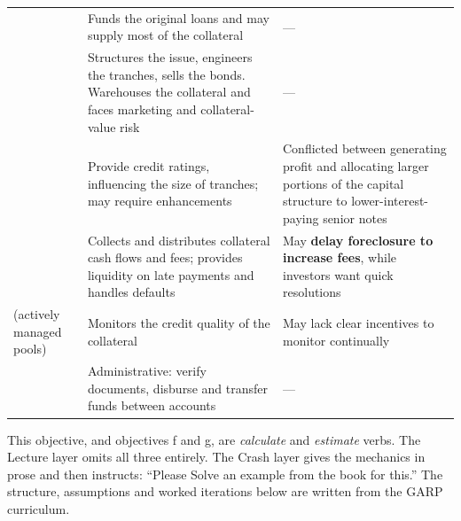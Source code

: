 \begin{center}
\footnotesize
\begin{tabular}{L{2.9cm} L{5.6cm} L{6.0cm}}
\toprule
{} &  &  \\
\midrule
{} & Funds the original loans and may supply most of the
  collateral & --- \\
 & Structures the issue, engineers the tranches, sells the
  bonds. Warehouses the collateral and faces marketing and collateral-value risk &
  --- \\
 & Provide credit ratings, influencing the size of
  tranches; may require enhancements &
  Conflicted between generating profit and allocating larger portions of the
  capital structure to lower-interest-paying senior notes \\
 & Collects and distributes collateral cash flows and fees;
  provides liquidity on late payments and handles defaults &
  May \textbf{delay foreclosure to increase fees}, while investors want quick
  resolutions \\
 \newline (actively managed pools) & Monitors the credit quality of
  the collateral &
  May lack clear incentives to monitor continually \\
 & Administrative: verify documents, disburse and
  transfer funds between accounts & --- \\
\bottomrule
\end{tabular}
\end{center}


\gapbadge

{\footnotesize\color{FRMGrey}This objective, and objectives f and g, are
\emph{calculate} and \emph{estimate} verbs. The Lecture layer omits all three
entirely. The Crash layer gives the mechanics in prose and then instructs:
``Please Solve an example from the book for this.'' The structure, assumptions and
worked iterations below are written from the GARP curriculum.}

